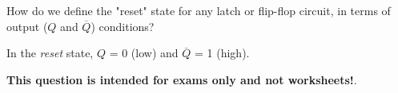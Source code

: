 

How do we define the "reset" state for any latch or flip-flop circuit, in terms of output ($Q$ and $\overline{Q}$) conditions?







In the {\it reset} state, $Q$ = 0 (low) and $\overline{Q}$ = 1 (high).







{\bf This question is intended for exams only and not worksheets!}.




